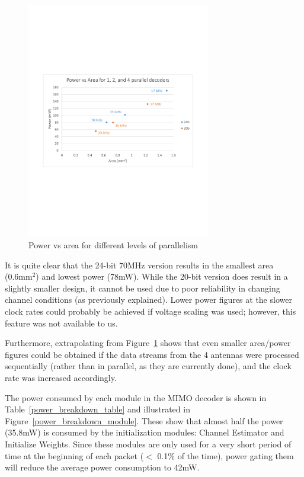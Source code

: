 \documentclass[journal]{IEEEtran}
\begin{document}
\begin{figure}[!h]
\centering
\includegraphics*[width=8cm, viewport = 60 250 560 540]{images/power_vs_area.pdf}
\caption{Power vs area for different levels of parallelism}
\label{power_vs_area}
\end{figure}

It is quite clear that the 24-bit 70MHz version results in the smallest area (0.6mm$^2$) and lowest power (78mW). While the 20-bit version does result in a slightly smaller design, it cannot be used due to poor reliability in changing channel conditions (as previously explained). Lower power figures at the slower clock rates could probably be achieved if voltage scaling was used; however, this feature was not available to us.

Furthermore, extrapolating from Figure~\ref{power_vs_area} shows that even smaller area/power figures could be obtained if the data streams from the 4 antennas were processed sequentially (rather than in parallel, as they are currently done), and the clock rate was increased accordingly.

The power consumed by each module in the MIMO decoder is shown in Table~\ref{power_breakdown_table} and illustrated in Figure~\ref{power_breakdown_module}. These show that almost half the power (35.8mW) is consumed by the initialization modules: Channel Estimator and Initialize Weights. Since these modules are only used for a very short period of time at the beginning of each packet ($<$ 0.1\% of the time), power gating them will reduce the average power consumption to 42mW.
\end{document}

